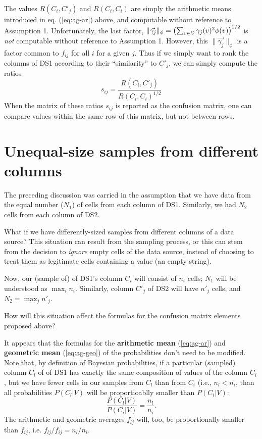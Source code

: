 \documentclass[12pt]{article}
\begin{document}
The values $R(C_i,C'_j)$ and $R(C_i,C_i)$ are simply the arithmetic
means introduced in eq. (\ref{eq:ag-ar}) above, and computable without
reference to Assumption 1. Unfortunately, the last factor,
$\|\vec{\gamma_j}\|_\phi=\left(\sum_{v\in \cal{V}}{\gamma_j(v)^2 \phi(v)}\right)^{1/2}$ is
  {\em not} computable without reference to Assumption 1. However,
  this $\|\vec{\gamma_j}\|_\phi$ is a factor common to $f_{ij}$ for all $i$ for a given
  $j$. Thus if we simply want to rank the columns of DS1 according to
  their ``similarity'' to $C'_j$, we can simply compute the ratios
\begin{equation}
\label{eq:ag-cos3}
s_{ij} = 
 \frac{ R(C_i,C'_j) }{ R(C_i,C_i)^{1/2} }
\end{equation}
When the matrix of these ratios $s_{ij}$ is reported as the confusion
matrix, one can compare values within the same row of this matrix, but
not between rows.

\section{Unequal-size samples from different columns}
The preceding discussion was carried in the assumption that we have
data from the equal number ($N_1$) of cells from each column of
DS1. Similarly, we had $N_2$ cells from each column of DS2.

What if we have differently-sized samples from different columns of a
data source? This situation can result from the sampling process, or
this can stem from the decision to {\em ignore} empty cells of the
data source, instead of choosing to treat them as legitimate cells
containing a value (an empty string).

Now, our (sample of) of DS1's column $C_i$ will consist of $n_i$
cells; $N_1$ will be understood as $\max_i n_i$. Similarly, column
$C'_j$ of DS2 will have $n'_j$ cells, and $N_2=\max_j n'_j$.

How will this situation affect the formulas for the confusion matrix
elements proposed above? 

It appears that the formulas for the {\bf arithmetic mean} (\ref{eq:ag-ar})
and {\bf geometric mean} (\ref{eq:ag-geo}) of the probabilities don't need
to be modified. Note that, by definition of Bayesian probabilities, if
a particular (sampled) column $C_l$ of of DS1 has exactly the same
composition of values of the column $C_i$, but we have fewer cells in
our samples from $C_l$ than from $C_i$ (i.e., $n_l < n_i$, than all
probabilities $P(C_l|V)$ will be proportioablly smaller than
$P(C_i|V)$:
$$
\frac{P(C_l|V)}{P(C_i|V)} = \frac{n_l}{n_i}.
$$ The arithmetic and geometric averages $f_{lj}$ will, too, be
proportionally smaller than $f_{ij}$, i.e. $f_{lj}/f_{ij}=n_l/n_i$.
\end{document}
